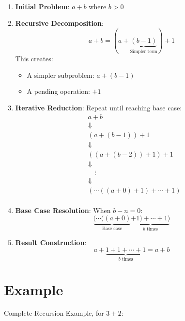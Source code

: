\documentclass{article}
\begin{document}
\begin{enumerate}
    \item \textbf{Initial Problem}: \(a + b\) where \(b > 0\)

    \item \textbf{Recursive Decomposition}:
          \[
              a + b = (a + \underbrace{(b - 1)}_{\text{Simpler term}}) + 1
          \]
          This creates:
          \begin{itemize}
              \item A simpler subproblem: \(a + (b - 1)\)
              \item A pending operation: \(+ 1\)
          \end{itemize}

    \item \textbf{Iterative Reduction}:
          Repeat until reaching base case:
          \[
              \begin{aligned}
                   & a + b                              \\
                   & \Downarrow                         \\
                   & (a + (b-1)) + 1                    \\
                   & \Downarrow                         \\
                   & ((a + (b-2)) + 1) + 1              \\
                   & \Downarrow                         \\
                   & \quad \vdots                       \\
                   & \Downarrow                         \\
                   & (\cdots((a + 0) + 1) + \cdots + 1) \\
              \end{aligned}
          \]

    \item \textbf{Base Case Resolution}:
          When \(b - n = 0\):
          \[
              \underbrace{(\cdots((a + 0)}_{\text{Base case}} \underbrace{+ 1) + \cdots + 1)}_{b \text{ times}}
          \]

    \item \textbf{Result Construction}:
          \[
              a + \underbrace{1 + 1 + \cdots + 1}_{b \text{ times}} = a + b
          \]
\end{enumerate}

\section{Example}
Complete Recursion Example, for \(3 + 2\):
\end{document}
